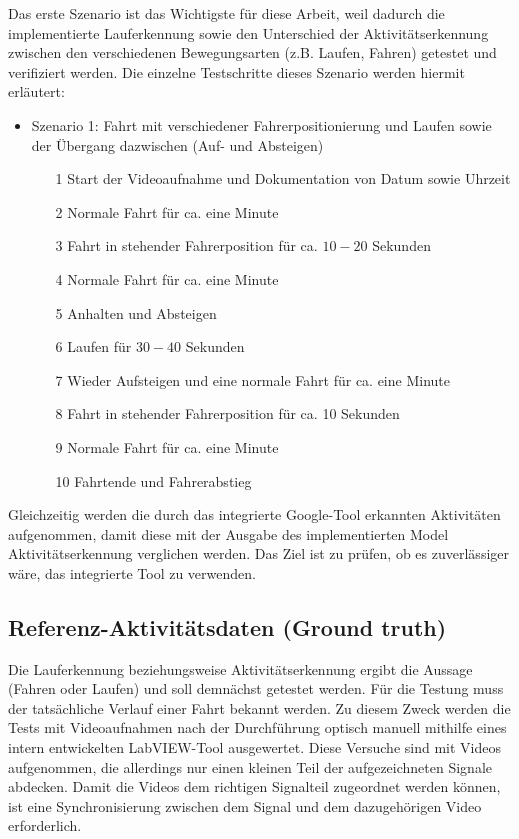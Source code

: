 Das erste Szenario ist das Wichtigste für diese Arbeit, weil dadurch die implementierte Lauferkennung sowie den Unterschied der Aktivitätserkennung zwischen den verschiedenen Bewegungsarten (z.B. Laufen, Fahren) getestet und verifiziert werden. Die einzelne Testschritte dieses Szenario werden hiermit erläutert:
\begin{itemize}
	\item Szenario 1: Fahrt mit verschiedener Fahrerpositionierung und Laufen sowie der Übergang dazwischen (Auf- und Absteigen)
	\begin{itemize}
		\item[1] Start der Videoaufnahme und Dokumentation von Datum sowie Uhrzeit
		\item[2] Normale Fahrt für ca. eine Minute
		\item[3] Fahrt in stehender Fahrerposition für ca. $10-20$ Sekunden
		\item[4] Normale Fahrt für ca. eine Minute
		\item[5] Anhalten und Absteigen
		\item[6] Laufen für $30-40$ Sekunden
		\item[7] Wieder Aufsteigen und eine normale Fahrt für ca. eine Minute
		\item[8] Fahrt in stehender Fahrerposition für ca. 10 Sekunden
		\item[9] Normale Fahrt für ca. eine Minute
		\item[10] Fahrtende und Fahrerabstieg
	\end{itemize}
\end{itemize}
Gleichzeitig werden die durch das integrierte Google-Tool erkannten Aktivitäten aufgenommen, damit diese mit der Ausgabe des implementierten Model \glqq Aktivitäts\-erke\-nnung\grqq{} verglichen werden. Das Ziel ist zu prüfen, ob es zuverlässiger wäre, das integrierte Tool zu verwenden.


\subsection{Referenz-Aktivitätsdaten (Ground truth)}

Die Lauferkennung beziehungsweise Aktivitätserkennung ergibt die Aussage (Fahren oder Laufen) und soll demnächst getestet werden. Für die Testung muss der tatsächliche Verlauf einer Fahrt bekannt werden. Zu diesem Zweck werden die Tests mit Videoaufnahmen nach der Durchführung optisch manuell mithilfe eines intern entwickelten LabVIEW-Tool ausgewertet. Diese Versuche sind mit Videos aufgenommen, die allerdings nur einen kleinen Teil der aufgezeichneten Signale abdecken. Damit die Videos dem richtigen Signalteil zugeordnet werden können, ist eine Synchronisierung zwischen dem Signal und dem dazugehörigen Video erforderlich. 

